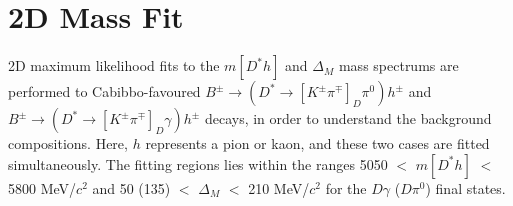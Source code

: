 \documentclass[oneside,12pt]{article}
\begin{document}
{\begin{landscape}
\begin{table}[]
\centering
{}
\caption{\small{Variables used in the training of the second stage BDT, ranked
by importance. $\gamma^{1}$ and $\gamma^{2}$ refer to the two daughter photons of the
$\pi^0$.}}
\label{table:bdt2TrainingVar}
\end{table}
\end{landscape}
}

\section{2D Mass Fit} \label{sec:massfit}

2D maximum likelihood fits to the $m[D^*h]$ and $\Delta_M$ mass spectrums are
performed to Cabibbo-favoured $B^{\pm}\rightarrow (D^*\rightarrow
[K^{\pm}\pi^{\mp}]_D\pi^0)h^{\pm}$ and $B^{\pm}\rightarrow (D^*\rightarrow
[K^{\pm}\pi^{\mp}]_D\gamma)h^{\pm}$ decays, in order to understand the
background compositions. Here, $h$ represents a pion or kaon, and these two
cases are fitted simultaneously. The fitting regions lies within the ranges 5050
$<$ $m[D^*h]$ $<$ 5800 MeV/$c^2$ and 50 (135) $<$ $\Delta_M$ $<$ 210 MeV/$c^2$
for the $D\gamma$ ($D\pi^0$) final states.
\end{document}
